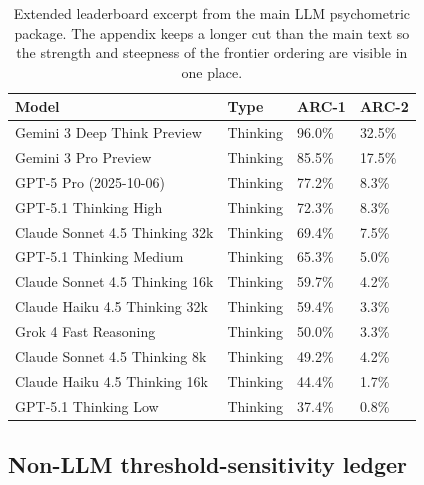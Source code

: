 \documentclass[11pt,letterpaper]{article}
\begin{document}
\begin{table}[H]
\centering
\scriptsize
\caption{Extended leaderboard excerpt from the main LLM psychometric package. The appendix keeps a longer cut than the main text so the strength and steepness of the frontier ordering are visible in one place.}
\begin{tabular}{p{2.45in}p{0.8in}p{0.8in}p{0.8in}}
\toprule
\textbf{Model} & \textbf{Type} & \textbf{ARC-1} & \textbf{ARC-2} \\
\midrule
Gemini 3 Deep Think Preview & Thinking & 96.0\% & 32.5\% \\
Gemini 3 Pro Preview & Thinking & 85.5\% & 17.5\% \\
GPT-5 Pro (2025-10-06) & Thinking & 77.2\% & 8.3\% \\
GPT-5.1 Thinking High & Thinking & 72.3\% & 8.3\% \\
Claude Sonnet 4.5 Thinking 32k & Thinking & 69.4\% & 7.5\% \\
GPT-5.1 Thinking Medium & Thinking & 65.3\% & 5.0\% \\
Claude Sonnet 4.5 Thinking 16k & Thinking & 59.7\% & 4.2\% \\
Claude Haiku 4.5 Thinking 32k & Thinking & 59.4\% & 3.3\% \\
Grok 4 Fast Reasoning & Thinking & 50.0\% & 3.3\% \\
Claude Sonnet 4.5 Thinking 8k & Thinking & 49.2\% & 4.2\% \\
Claude Haiku 4.5 Thinking 16k & Thinking & 44.4\% & 1.7\% \\
GPT-5.1 Thinking Low & Thinking & 37.4\% & 0.8\% \\
\bottomrule
\end{tabular}
\end{table}

\subsection{Non-LLM threshold-sensitivity ledger}
\end{document}

